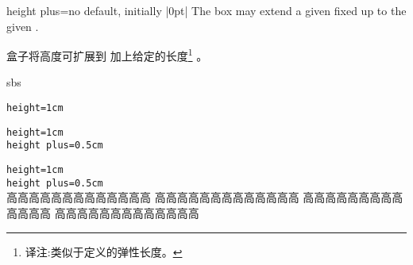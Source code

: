 \begin{docTcbKey}{height plus}{=}{no default, initially |0pt|}
The box may extend a given fixed  up to the given .

盒子将高度可扩展到  加上给定的长度\footnote{译注:类似于定义的弹性长度。} 。
\begin{dispExample*}{sbs}

\begin{tcolorbox}[height=1cm]
\verb|height=1cm|
\end{tcolorbox}
\begin{tcolorbox}[height=1cm,height plus=0.5cm] 
\verb|height=1cm|\\
\verb|height plus=0.5cm|
\end{tcolorbox}
\begin{tcolorbox}[height=1cm,height plus=0.5cm] 
\verb|height=1cm|\\
\verb|height plus=0.5cm|\\
高高高高高高高高高高高高高%
高高高高高高高高高高高高高%
高高高高高高高高高高高高高%
高高高高高高高高高高高高高%
\end{tcolorbox}
\end{dispExample*}
\end{docTcbKey}